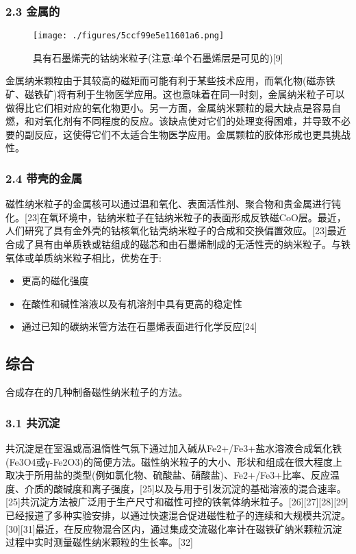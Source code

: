 \subsubsection{2.3 金属的}
\begin{figure}[ht]
\centering
\texttt{[image: ./figures/5ccf99e5e11601a6.png]}
\caption{具有石墨烯壳的钴纳米粒子(注意:单个石墨烯层是可见的)[9]} \label{fig_CXNMLZ_2}
\end{figure}
金属纳米颗粒由于其较高的磁矩而可能有利于某些技术应用，而氧化物(磁赤铁矿、磁铁矿)将有利于生物医学应用。这也意味着在同一时刻，金属纳米粒子可以做得比它们相对应的氧化物更小。另一方面，金属纳米颗粒的最大缺点是容易自燃，和对氧化剂有不同程度的反应。该缺点使对它们的处理变得困难，并导致不必要的副反应，这使得它们不太适合生物医学应用。金属颗粒的胶体形成也更具挑战性。

\subsubsection{2.4 带壳的金属}
磁性纳米粒子的金属核可以通过温和氧化、表面活性剂、聚合物和贵金属进行钝化。[23]在氧环境中，钴纳米粒子在钴纳米粒子的表面形成反铁磁CoO层。最近，人们研究了具有金外壳的钴核氧化钴壳纳米粒子的合成和交换偏置效应。[23]最近合成了具有由单质铁或钴组成的磁芯和由石墨烯制成的无活性壳的纳米粒子。与铁氧体或单质纳米粒子相比，优势在于:
\begin{itemize}
\item 更高的磁化强度
\item 在酸性和碱性溶液以及有机溶剂中具有更高的稳定性
\item 通过已知的碳纳米管方法在石墨烯表面进行化学反应[24]
\end{itemize}

\subsection{综合}
合成存在的几种制备磁性纳米粒子的方法。

\subsubsection{3.1 共沉淀}
共沉淀是在室温或高温惰性气氛下通过加入碱从Fe2+/Fe3+盐水溶液合成氧化铁(Fe3O4或γ-Fe2O3)的简便方法。磁性纳米粒子的大小、形状和组成在很大程度上取决于所用盐的类型(例如氯化物、硫酸盐、硝酸盐)、Fe2+/Fe3+比率、反应温度、介质的酸碱度和离子强度，[25]以及与用于引发沉淀的基础溶液的混合速率。[25]共沉淀方法被广泛用于生产尺寸和磁性可控的铁氧体纳米粒子。[26][27][28][29]已经报道了多种实验安排，以通过快速混合促进磁性粒子的连续和大规模共沉淀。[30][31]最近，在反应物混合区内，通过集成交流磁化率计在磁铁矿纳米颗粒沉淀过程中实时测量磁性纳米颗粒的生长率。[32]